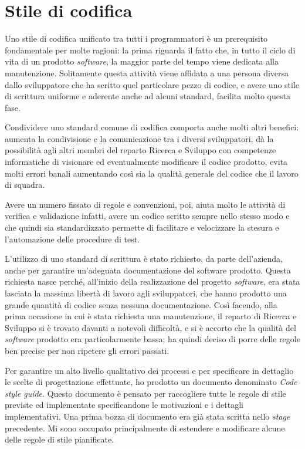 \section{Stile di codifica}

Uno stile di codifica unificato tra tutti i programmatori è un prerequisito fondamentale per molte ragioni: la prima  riguarda il fatto che, in tutto il ciclo di vita di un prodotto \textit{software}, la maggior parte del tempo viene dedicata alla manutenzione. Solitamente questa attività viene affidata a una persona diversa dallo sviluppatore che ha scritto quel particolare pezzo di codice, e avere uno stile di scrittura uniforme e aderente anche ad alcuni standard, facilita molto questa fase.

Condividere uno standard comune di codifica comporta anche molti altri benefici: aumenta la condivisione e la comunicazione tra i diversi sviluppatori, dà la possibilità agli altri membri del reparto Ricerca e Sviluppo con competenze informatiche di visionare ed eventualmente modificare il codice prodotto, evita molti errori banali aumentando così sia la qualità generale del codice che il lavoro di squadra.

Avere un numero fissato di regole e convenzioni, poi, aiuta molto le attività di verifica e validazione infatti, avere un codice scritto sempre nello stesso modo e che quindi sia standardizzato permette di facilitare e velocizzare la stesura e l'automazione delle procedure di test.

L'utilizzo di uno standard di scrittura è stato richiesto, da parte dell'azienda, anche per garantire un'adeguata documentazione del software prodotto. Questa richiesta nasce perché, all'inizio della realizzazione del progetto \textit{software}, era stata lasciata la massima libertà di lavoro agli sviluppatori, che hanno prodotto una grande quantità di codice senza nessuna documentazione. Così facendo, alla prima occasione in cui è stata richiesta una manutenzione, il reparto di Ricerca e Sviluppo si è trovato davanti a notevoli difficoltà, e si è accorto che la qualità del \textit{software} prodotto era particolarmente bassa; ha quindi deciso di porre delle regole ben precise per non ripetere gli errori passati.

Per garantire un alto livello qualitativo dei processi e per specificare in dettaglio le scelte di progettazione effettuate, ho prodotto un documento denominato \textit{Code style guide}. Questo documento è pensato per raccogliere tutte le regole di stile previste ed implementate specificandone le motivazioni e i dettagli implementativi. Una prima bozza di documento era già stata scritta nello \textit{stage} precedente. Mi sono occupato principalmente di estendere e modificare alcune delle regole di stile pianificate.

